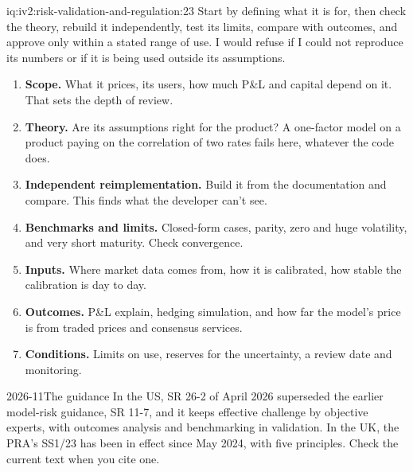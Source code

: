 \begin{solution}{iq:iv2:risk-validation-and-regulation:23}
Start by defining what it is for, then check the theory, rebuild it independently, test its limits, compare with outcomes, and approve only within a stated range of use. I would refuse if I could not reproduce its numbers or if it is being used outside its assumptions.

\begin{enumerate}
\item \textbf{Scope.} What it prices, its users, how much P\&L and capital depend on it. That sets the depth of review.
\item \textbf{Theory.} Are its assumptions right for the product? A one-factor model on a product paying on the correlation of two rates fails here, whatever the code does.
\item \textbf{Independent reimplementation.} Build it from the documentation and compare. This finds what the developer can't see.
\item \textbf{Benchmarks and limits.} Closed-form cases, parity, zero and huge volatility, and very short maturity. Check convergence.
\item \textbf{Inputs.} Where market data comes from, how it is calibrated, how stable the calibration is day to day.
\item \textbf{Outcomes.} P\&L explain, hedging simulation, and how far the model's price is from traded prices and consensus services.
\item \textbf{Conditions.} Limits on use, reserves for the uncertainty, a review date and monitoring.
\end{enumerate}

\begin{dated}{2026-11}{The guidance}\label{dat:iv2:risk-validation-and-regulation:mrm}
In the US, SR 26-2 of April 2026 superseded the earlier model-risk guidance, SR 11-7, and it keeps effective challenge by objective experts, with outcomes analysis and benchmarking in validation. In the UK, the PRA's SS1/23 has been in effect since May 2024, with five principles. Check the current text when you cite one.
\end{dated}

\end{solution}


